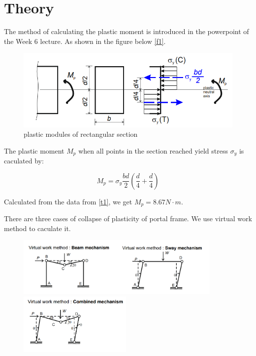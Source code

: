 \section{Theory}
\FloatBarrier %

The method of calculating the plastic moment is introduced in the powerpoint of the Week 6 lecture. As shown in the figure below \autoref{f1}.

\begin{figure}
    \centering
    \includegraphics[]{./fig/11.png}
    \caption{plastic modules of rectangular section  }
    \label{f1}
\end{figure}

The plastic moment $M_p$ when all points in the section reached
yield stress $\sigma_y$ is caculated by:

\begin{equation} 
    M_p=\sigma_y\frac{bd}{2}(\frac{d}{4}+\frac{d}{4})
    \label{e1}
\end{equation}

Calculated from the data from \autoref{t1}, we get $M_p=8.67N \cdot m$.

There are three cases of collapse of plasticity of portal frame. We use virtual work method to caculate it.

\begin{figure}[htbp]
    \centering
    \includegraphics[width=10cm]{./fig/12.png}
    \includegraphics[width=5.5cm]{./fig/13.png}
    \label{f2}
\end{figure}


